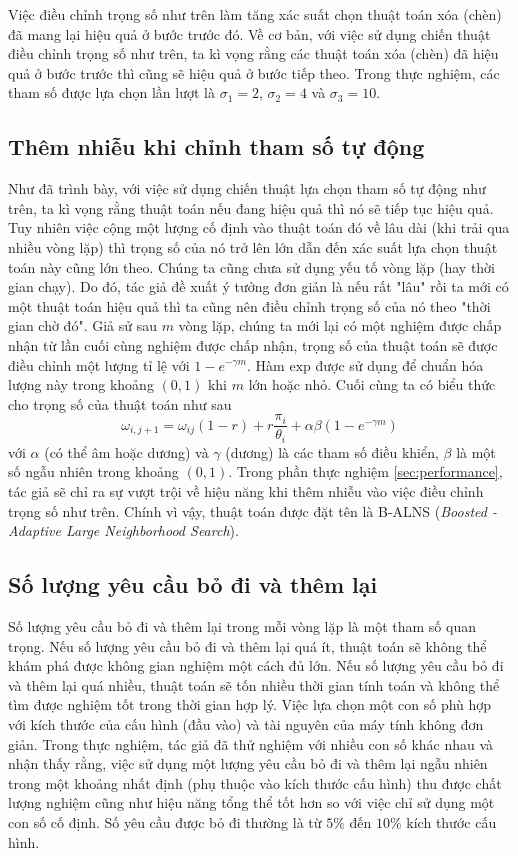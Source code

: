 Việc điều chỉnh trọng số như trên làm tăng xác suất chọn thuật toán xóa (chèn) đã mang lại hiệu quả ở bước trước đó. Về cơ bản, với việc sử dụng chiến thuật điều chỉnh trọng số như trên, ta kì vọng rằng các thuật toán xóa (chèn) đã hiệu quả ở bước trước thì cũng sẽ hiệu quả ở bước tiếp theo. Trong thực nghiệm, các tham số được lựa chọn lần lượt là $\sigma_1=2$, $\sigma_2=4$ và $\sigma_3=10$.

\subsection{Thêm nhiễu khi chỉnh tham số tự động}
Như đã trình bày, với việc sử dụng chiến thuật lựa chọn tham số tự động như trên, ta kì vọng rằng thuật toán nếu đang hiệu quả thì nó sẽ tiếp tục hiệu quả. Tuy nhiên việc cộng một lượng cố định vào thuật toán đó về lâu dài (khi trải qua nhiều vòng lặp) thì trọng số của nó trở lên lớn dẫn đến xác suất lựa chọn thuật toán này cũng lớn theo. Chúng ta cũng chưa sử dụng yếu tố vòng lặp (hay thời gian chạy). Do đó, tác giả đề xuất ý tưởng đơn giản là nếu rất "lâu" rồi ta mới có một thuật toán hiệu quả thì ta cũng nên điều chỉnh trọng số của nó theo "thời gian chờ đó". Giả sử sau $m$ vòng lặp, chúng ta mới lại có một nghiệm được chấp nhận từ lần cuối cùng nghiệm được chấp nhận, trọng số của thuật toán sẽ được điều chỉnh một lượng tỉ lệ với $1 - e^{-\gamma m}$. Hàm $\text{exp}$ được sử dụng để chuẩn hóa lượng này trong khoảng $(0,1)$ khi $m$ lớn hoặc nhỏ. Cuối cùng ta có biểu thức cho trọng số của thuật toán như sau
\begin{equation}
	\label{eq:boost_adaptive_weight}
	\omega_{i, j+1} = \omega_{ij}(1-r)+r\frac{\pi_i} {\theta_i} + \alpha \beta (1 - e^{-\gamma m})
\end{equation}
với $\alpha$ (có thể âm hoặc dương) và $\gamma$ (dương) là các tham số điều khiển, $\beta$ là một số ngẫu nhiên trong khoảng $(0,1)$. Trong phần thực nghiệm \ref{sec:performance}, tác giả sẽ chỉ ra sự vượt trội về hiệu năng khi thêm nhiễu vào việc điều chỉnh trọng số như trên. Chính vì vậy, thuật toán được đặt tên là B-ALNS (\textit{Boosted - Adaptive Large Neighborhood Search}).

\subsection{Số lượng yêu cầu bỏ đi và thêm lại}
\label{sec:num_rm_req}
Số lượng yêu cầu bỏ đi và thêm lại trong mỗi vòng lặp là một tham số quan trọng. Nếu số lượng yêu cầu bỏ đi và thêm lại quá ít, thuật toán sẽ không thể khám phá được không gian nghiệm một cách đủ lớn. Nếu số lượng yêu cầu bỏ đi và thêm lại quá nhiều, thuật toán sẽ tốn nhiều thời gian tính toán và không thể tìm được nghiệm tốt trong thời gian hợp lý. Việc lựa chọn một con số phù hợp với kích thước của cấu hình (đầu vào) và tài nguyên của máy tính không đơn giản. Trong thực nghiệm, tác giả đã thử nghiệm với nhiều con số khác nhau và nhận thấy rằng, việc sử dụng một lượng yêu cầu bỏ đi và thêm lại ngẫu nhiên trong một khoảng nhất định (phụ thuộc vào kích thước cấu hình) thu được chất lượng nghiệm cũng như hiệu năng tổng thể tốt hơn so với việc chỉ sử dụng một con số cố định. Số yêu cầu được bỏ đi thường là từ $5\%$ đến $10\%$ kích thước cấu hình.
